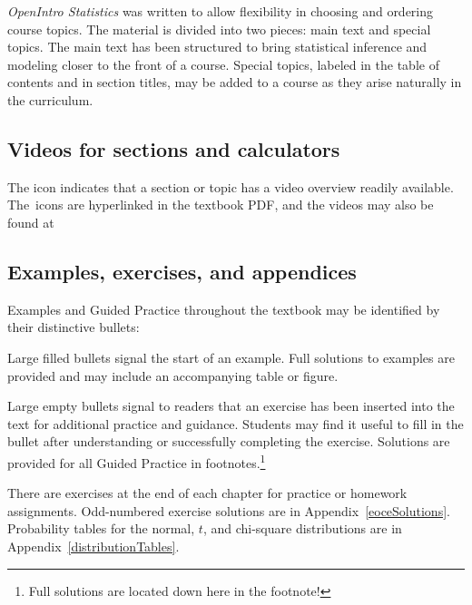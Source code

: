 \emph{OpenIntro Statistics} was written to allow flexibility in choosing and ordering course topics. The material is divided into two pieces: main text and special topics. The main text has been structured to bring statistical inference and modeling closer to the front of a course. Special topics, labeled in the table of contents and in section titles, may be added to a course as they arise naturally in the curriculum.


\subsection*{Videos for sections and calculators}

The  icon indicates that a section or topic has a video overview readily available. The~icons are hyperlinked in the textbook PDF, and the videos may also be found at
\begin{center}
\end{center}


\subsection*{Examples, exercises, and appendices}

Examples and Guided Practice throughout the textbook may be identified by their distinctive bullets:

\begin{example}{Large filled bullets signal the start of an example.}
Full solutions to examples are provided and may include an accompanying table or figure.
 \end{example}

\begin{exercise}
Large empty bullets signal to readers that an exercise has been inserted into the text for additional practice and guidance. Students may find it useful to fill in the bullet after understanding or successfully completing the exercise. Solutions are provided for all Guided Practice in footnotes.\footnote{Full solutions are located down here in the footnote!}
\end{exercise}

There are exercises at the end of each chapter for practice or homework assignments. Odd-numbered exercise solutions are in Appendix~\ref{eoceSolutions}. Probability tables for the normal, $t$, and chi-square distributions are in Appendix~\ref{distributionTables}.

